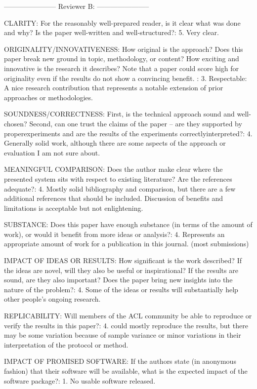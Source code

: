 \documentclass[10pt,a4paper]{letter}
\begin{document}
-----------------------
Reviewer B:
-----------------------


CLARITY: For the reasonably well-prepared reader, is it clear what was done
and why? Is the paper well-written and well-structured?:
        5. Very clear.


ORIGINALITY/INNOVATIVENESS: How original is the approach? Does this paper
break new ground in topic, methodology, or content? How exciting and
innovative is the research it describes?
Note that a paper could score high for originality even if the results do
not show a convincing benefit.
:
        3. Respectable: A nice research contribution that represents a notable
extension of prior approaches or methodologies.

SOUNDNESS/CORRECTNESS: First, is the technical approach sound and
well-chosen? Second, can one trust the claims of the paper -- are they
supported by properexperiments and are the results of the experiments
correctlyinterpreted?:
        4. Generally solid work, although there are some aspects of the approach or
evaluation I am not sure about.

MEANINGFUL COMPARISON: Does the author make clear where the presented system
sits with respect to existing literature? Are the references adequate?:
        4. Mostly solid bibliography and comparison, but there are a few additional
references that should be included. Discussion of benefits and limitations
is acceptable but not enlightening.

SUBSTANCE: Does this paper have enough substance (in terms of the amount of
work), or would it benefit from more ideas or analysis?:
        4. Represents an appropriate amount of work for a publication in this
journal. (most submissions)

IMPACT OF IDEAS OR RESULTS: How significant is the work described? If the
ideas are novel, will they also be useful or inspirational? If the results
are sound, are they also important? Does the paper bring new insights into
the nature of the problem?:
        4. Some of the ideas or results will substantially help other people's
ongoing research.

REPLICABILITY: Will members of the ACL community be able to reproduce or
verify the results in this paper?:
        4. could mostly reproduce the results, but there may be some
variation because of sample variance or minor variations in their
interpretation of the protocol or method.

IMPACT OF PROMISED SOFTWARE:  If the authors state (in anonymous fashion)
that their software will be available, what is the expected impact of the
software package?:
        1. No usable software released.
\end{document}
